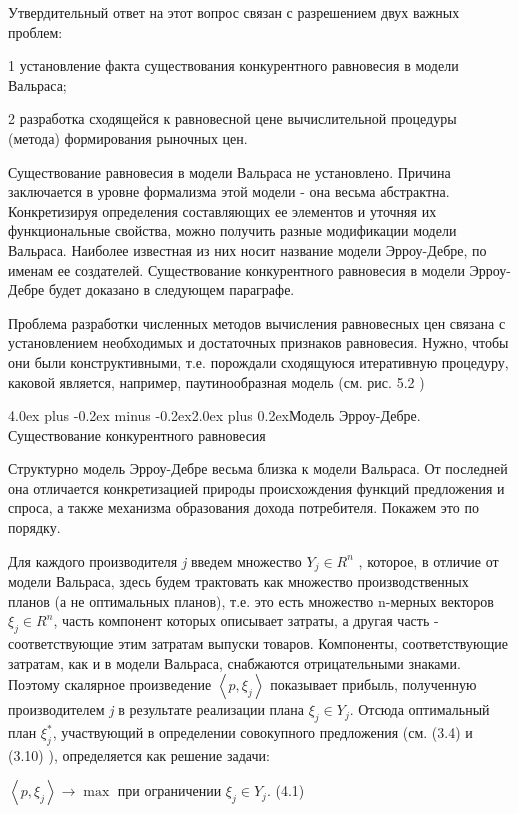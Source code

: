\documentclass[12pt, 4paper]{book}
\makeatletter
\renewcommand{\section}{\@startsection{section}{1}{1pt}%
	{4.0ex plus -0.2ex minus -0.2ex}{2.0ex plus 0.2ex}{\centering\bf}}%
\makeatother
\begin{document}
{Утвердительный ответ на этот вопрос связан с разрешением двух важных проблем:
\par

1 установление факта существования конкурентного равновесия в модели Вальраса; 
\par

2 разработка сходящейся к равновесной цене вычислительной процедуры (метода) формирования рыночных цен.
\par

Существование равновесия в модели Вальраса не установлено. Причина заключается в уровне формализма этой модели - она весьма абстрактна. Конкретизируя определения составляющих ее элементов и уточняя их функциональные свойства, можно получить разные модификации модели Вальраса. Наиболее известная из них носит название модели Эрроу-Дебре, по именам ее создателей. Существование конкурентного равновесия в модели Эрроу-Дебре будет доказано в следующем параграфе.
\par

Проблема разработки численных методов вычисления равновесных цен связана с установлением необходимых и достаточных признаков равновесия. Нужно, чтобы они были конструктивными, т.е. порождали сходящуюся итеративную процедуру, каковой является, например, паутинообразная модель (см. рис. 5.2 )
\newpage
\begin{center}
\section{Модель Эрроу-Дебре. Существование конкурентного равновесия}
\end{center}
\par

Структурно модель Эрроу-Дебре весьма близка к модели Вальраса. От последней она отличается конкретизацией природы происхождения функций предложения и спроса, а также механизма образования дохода потребителя. Покажем это по порядку.
\par

Для каждого производителя \textit{j} введем множество $Y_j \in R^{n}$ , которое, в отличие от модели Вальраса, здесь будем трактовать как множество производственных планов (а не оптимальных планов), т.е. это есть множество n-мерных векторов $\xi_{j} \in R^{n}$, часть компонент которых описывает затраты, а другая часть - соответствующие этим затратам выпуски товаров. Компоненты, соответствующие затратам, как и в модели Вальраса, снабжаются отрицательными знаками. Поэтому скалярное произведение $\left\langle  p,\xi_j \right\rangle$ показывает прибыль, полученную производителем \textit{j} в результате реализации плана $\xi_j \in Y_j$. Отсюда оптимальный план $\xi_{j}^{*}$, участвующий в определении совокупного предложения (см. (3.4) и (3.10) ), определяется как решение задачи:
\begin{center}
$\left\langle p,\xi_{j} \right\rangle \rightarrow \max$ при ограничении $\xi_{j} \in Y_j.$ (4.1)
\end{center}
\par

}
\end{document}
